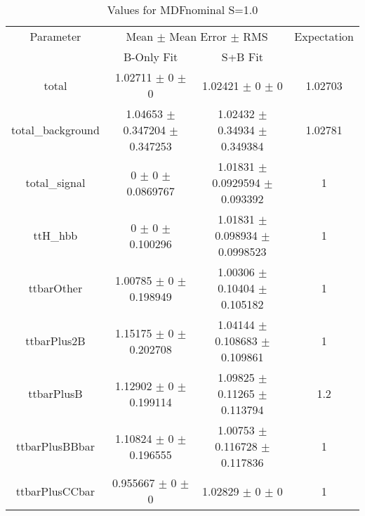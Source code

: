 \begin{table}
\centering
\caption{Values for MDFnominal S=1.0}
\begin{tabular}{cccc}
\toprule
Parameter & \multicolumn{2}{c}{Mean $\pm$ Mean Error $\pm$ RMS} & Expectation\\
 & B-Only Fit & S+B Fit & \\
\midrule
total & \num{1.02711} $\pm$ \num{0} $\pm$ \num{0} & \num{1.02421} $\pm$ \num{0} $\pm$ \num{0} & \num{1.02703}\\
total\_background & \num{1.04653} $\pm$ \num{0.347204} $\pm$ \num{0.347253} & \num{1.02432} $\pm$ \num{0.34934} $\pm$ \num{0.349384} & \num{1.02781}\\
total\_signal & \num{0} $\pm$ \num{0} $\pm$ \num{0.0869767} & \num{1.01831} $\pm$ \num{0.0929594} $\pm$ \num{0.093392} & \num{1}\\
ttH\_hbb & \num{0} $\pm$ \num{0} $\pm$ \num{0.100296} & \num{1.01831} $\pm$ \num{0.098934} $\pm$ \num{0.0998523} & \num{1}\\
ttbarOther & \num{1.00785} $\pm$ \num{0} $\pm$ \num{0.198949} & \num{1.00306} $\pm$ \num{0.10404} $\pm$ \num{0.105182} & \num{1}\\
ttbarPlus2B & \num{1.15175} $\pm$ \num{0} $\pm$ \num{0.202708} & \num{1.04144} $\pm$ \num{0.108683} $\pm$ \num{0.109861} & \num{1}\\
ttbarPlusB & \num{1.12902} $\pm$ \num{0} $\pm$ \num{0.199114} & \num{1.09825} $\pm$ \num{0.11265} $\pm$ \num{0.113794} & \num{1.2}\\
ttbarPlusBBbar & \num{1.10824} $\pm$ \num{0} $\pm$ \num{0.196555} & \num{1.00753} $\pm$ \num{0.116728} $\pm$ \num{0.117836} & \num{1}\\
ttbarPlusCCbar & \num{0.955667} $\pm$ \num{0} $\pm$ \num{0} & \num{1.02829} $\pm$ \num{0} $\pm$ \num{0} & \num{1}\\
\bottomrule
\end{tabular}
\end{table}